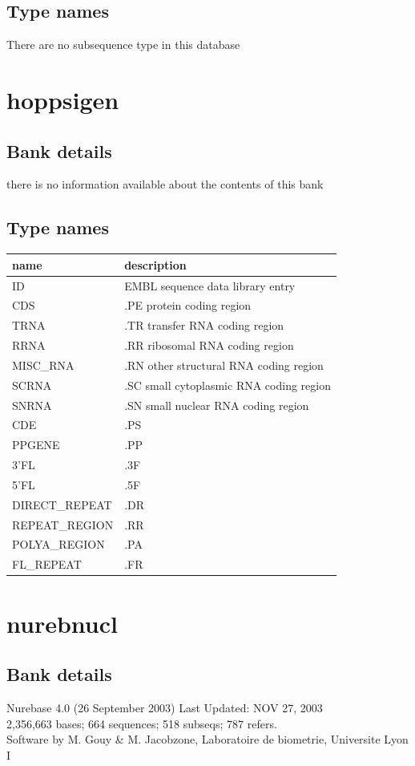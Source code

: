 \documentclass{article}
\begin{document}
\begin{Schunk}
\subsection{Type names}
There are no subsequence type in this database
\section{ hoppsigen }
\subsection{Bank details}
there is no information available about the contents of this bank

\subsection{Type names}
\noindent\begin{tabular}{ll}
\hline \hline
name & description\\
\hline
ID & EMBL sequence data library entry \\
CDS & .PE protein coding region \\
TRNA & .TR transfer RNA coding region \\
RRNA & .RR ribosomal RNA coding region \\
MISC\_RNA & .RN other structural RNA coding region \\
SCRNA & .SC small cytoplasmic RNA coding region \\
SNRNA & .SN small nuclear RNA coding region \\
CDE & .PS \\
PPGENE & .PP \\
3'FL & .3F \\
5'FL & .5F \\
DIRECT\_REPEAT & .DR \\
REPEAT\_REGION & .RR \\
POLYA\_REGION & .PA \\
FL\_REPEAT & .FR \\
\hline \hline
\end{tabular}

\section{ nurebnucl }
\subsection{Bank details}
Nurebase 4.0 (26 September 2003) Last Updated: NOV 27, 2003\\
2,356,663 bases; 664 sequences; 518 subseqs; 787 refers.\\
Software by M. Gouy \& M. Jacobzone, Laboratoire de biometrie, Universite Lyon I


\end{Schunk}
\end{document}
